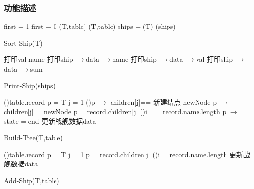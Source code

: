 \subsubsection{功能描述}
\begin{function}
    first = 1\;
    {
        {
            first = 0\;
            \build(T,table)\;
        }
        {
            \add(T,table)\;
        }
    }
    ships = \traverse(T)\;
    \quick(ships)\;
    \;
    \caption{Sort-Ship(T)}
\end{function}
\begin{function}[H]
    打印val-name\;
    {
        打印ship $\rightarrow$data $\rightarrow$name\;
        打印ship $\rightarrow$data $\rightarrow$val\;
        打印ship $\rightarrow$data $\rightarrow$sum\;
    }
    \caption{Print-Ship(ships)}
\end{function}
\begin{function}
    \ForEach(){table.record}
    {
        p = T\;
        {
            j = 1\;
            \;
            \If(){p $\rightarrow$ children[j]==\NULL}
            {
                新建结点 newNode\;
                p $\rightarrow$children[j] = newNode\;
            }
            p = record.children[j]\;         
            \If(){i == record.name.length}
            {
            p $\rightarrow$ state = end\;
            更新战舰数据data\;
            }
        }
    }
    \caption{Build-Tree(T,table)}
\end{function}
\begin{function}
    \ForEach(){table.record}
    {
        p = T\;
        {
            j = 1\;
            p = record.children[j]\;         
            \lIf(){i = record.name.length}
            {
            更新战舰数据data\;
            }
        }
    }
    \caption{Add-Ship(T,table)}
\end{function}
